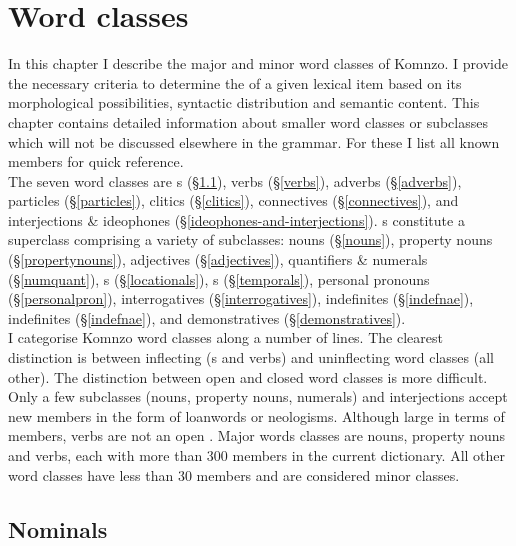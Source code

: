 \chapter{Word classes} \label{cha:word classes}

In this chapter I describe the major and minor word classes of Komnzo. I provide the necessary criteria to determine the  of a given lexical item based on its morphological possibilities, syntactic distribution and semantic content. This chapter contains detailed information about smaller word classes or subclasses which will not be discussed elsewhere in the grammar. For these I list all known members for quick reference.\\

The seven word classes are s (\S{}\ref{nominals-intro}), verbs (\S{}\ref{verbs}), adverbs (\S{}\ref{adverbs}), particles (\S{}\ref{particles}), clitics (\S{}\ref{clitics}), connectives (\S{}\ref{connectives}), and interjections \& ideophones (\S{}\ref{ideophones-and-interjections}). s constitute a superclass comprising a variety of subclasses: nouns (\S{}\ref{nouns}), property nouns (\S{}\ref{propertynouns}), adjectives (\S{}\ref{adjectives}), quantifiers \& numerals (\S{}\ref{numquant}),  s (\S{}\ref{locationals}),  s (\S{}\ref{temporals}), personal pronouns (\S{}\ref{personalpron}), interrogatives (\S{}\ref{interrogatives}), indefinites (\S{}\ref{indefnae}), indefinites (\S{}\ref{indefnae}), and demonstratives (\S{}\ref{demonstratives}).\\

I categorise Komnzo word classes along a number of lines. The clearest distinction is between inflecting (s and verbs) and uninflecting word classes (all other). The distinction between open and closed word classes is more difficult. Only a few  subclasses (nouns, property nouns, numerals) and interjections accept new members in the form of loanwords or neologisms. Although large in terms of members, verbs are not an open . Major words classes are nouns, property nouns and verbs, each with more than 300 members in the current dictionary. All other word classes have less than 30 members and are considered minor classes.

\section{Nominals} \label{nominals-intro}

